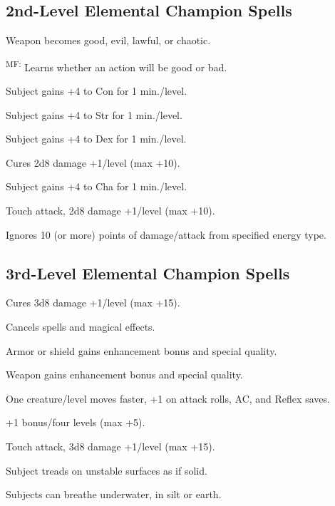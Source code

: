 \subsection{2nd-Level Elemental Champion Spells}

 Weapon becomes good, evil, lawful, or chaotic.

\textsuperscript{MF:} Learns whether an action will be good or bad.

 Subject gains +4 to Con for 1 min./level.

 Subject gains +4 to Str for 1 min./level.

 Subject gains +4 to Dex for 1 min./level.

 Cures 2d8 damage +1/level (max +10).

 Subject gains +4 to Cha for 1 min./level.

 Touch attack, 2d8 damage +1/level (max +10).

 Ignores 10 (or more) points of damage/attack from specified energy type.




\subsection{3rd-Level Elemental Champion Spells}

 Cures 3d8 damage +1/level (max +15).

 Cancels spells and magical effects.

 Armor or shield gains enhancement bonus and special quality. %

 Weapon gains enhancement bonus and special quality. %

 One creature/level moves faster, +1 on attack rolls, AC, and Reflex saves.

 +1 bonus/four levels (max +5).

 Touch attack, 3d8 damage +1/level (max +15).

 Subject treads on unstable surfaces as if solid. %

 Subjects can breathe underwater, in silt or earth. %




